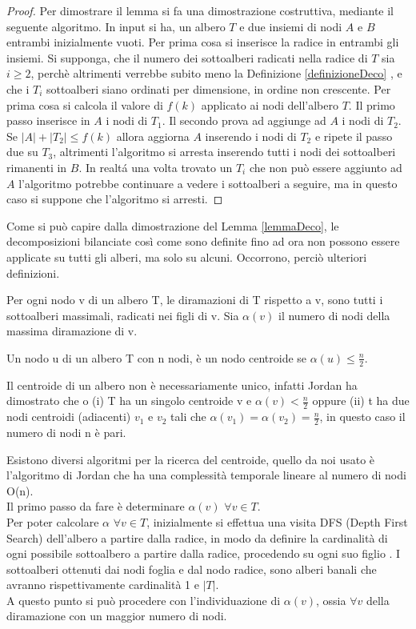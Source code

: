 \begin{proof}
Per dimostrare il lemma si fa una dimostrazione costruttiva, mediante il seguente algoritmo.
In input si ha, un albero $ T $ e due insiemi di nodi $ A $ e $ B $ entrambi inizialmente vuoti.
Per prima cosa si inserisce la radice in entrambi gli insiemi.
Si supponga, che il numero dei sottoalberi radicati nella radice di $ T $ sia $ i \ge 2 $, perch\`e altrimenti verrebbe subito meno la Definizione \ref{definizioneDeco} , e che i $ T_i $ sottoalberi siano ordinati per dimensione, in ordine non crescente.
Per prima cosa si calcola il valore di $ f(k) $ applicato ai nodi dell'albero $ T $.
Il primo passo inserisce in $ A $ i nodi di $ T_1 $.
Il secondo prova ad aggiunge ad $ A $ i nodi di $ T_2 $.
Se $ |A| + |T_2| \le f(k) $ allora aggiorna $ A $ inserendo i nodi di $ T_2 $ e ripete il passo due su $ T_3 $, altrimenti l'algoritmo si arresta inserendo tutti i nodi dei sottoalberi rimanenti in $ B $.
In realt\'a una volta trovato un $ T_i $ che non pu\`o essere aggiunto ad $ A $ l'algoritmo potrebbe continuare a vedere i sottoalberi a seguire, ma in questo caso si suppone che l'algoritmo si arresti.
\end{proof}

Come si pu\`o capire dalla dimostrazione del Lemma \ref{lemmaDeco}, le decomposizioni bilanciate cos\`i come sono definite fino ad ora non possono essere applicate su tutti gli alberi, ma solo su alcuni.
Occorrono, perci\`o ulteriori definizioni.
   
\begin{definizione}
Per ogni nodo v di un albero T, le diramazioni di T  rispetto a v, sono tutti i sottoalberi massimali, radicati nei figli di v. 
Sia $\alpha(v)$ il numero di nodi della massima diramazione di v. 

Un nodo u di un albero T con n nodi, \`e un nodo centroide se $\alpha(u)\le\frac{n}{2}$.

Il centroide di un albero non \`e necessariamente unico, infatti Jordan \cite{jordan1869assemblages}  ha dimostrato che o (i) T ha un singolo centroide v e $\alpha(v) < \frac{n}{2}$ oppure (ii) t ha due nodi centroidi (adiacenti) $v_1$ e $v_2$ tali che $\alpha(v_1) = \alpha(v_2) = \frac{n}{2}$, in questo caso il numero di nodi n \`e pari.
\end{definizione}

Esistono diversi algoritmi per la ricerca del centroide, quello da noi usato \`e l'algoritmo di Jordan che  ha una complessit\`a temporale lineare al numero di nodi O(n). \\
Il primo passo da fare \`e determinare $\alpha(v)$ $\forall v \in T$.\\
Per poter calcolare $\alpha$ $\forall v \in T$, inizialmente si effettua una visita DFS (Depth First Search) dell'albero a partire dalla radice, in modo da definire la cardinalit\`a di ogni possibile sottoalbero a partire dalla radice, procedendo su ogni suo figlio .
I sottoalberi ottenuti dai nodi foglia e dal nodo radice, sono alberi banali che avranno rispettivamente cardinalit\`a 1 e $|T|$. \\
A questo punto si pu\`o procedere con l'individuazione di $\alpha (v)$, ossia $\forall v$ della diramazione con un maggior numero di nodi.

